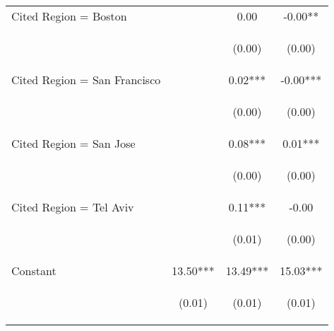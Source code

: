 \begin{center}
\begin{tabular}{lccc}
Cited Region = Boston &  & 0.00 & -0.00** \\
\vspace{4pt} & \begin{footnotesize}\end{footnotesize} & \begin{footnotesize}(0.00)\end{footnotesize} & \begin{footnotesize}(0.00)\end{footnotesize} \\
Cited Region = San Francisco &  & 0.02*** & -0.00*** \\
\vspace{4pt} & \begin{footnotesize}\end{footnotesize} & \begin{footnotesize}(0.00)\end{footnotesize} & \begin{footnotesize}(0.00)\end{footnotesize} \\
Cited Region = San Jose &  & 0.08*** & 0.01*** \\
\vspace{4pt} & \begin{footnotesize}\end{footnotesize} & \begin{footnotesize}(0.00)\end{footnotesize} & \begin{footnotesize}(0.00)\end{footnotesize} \\
Cited Region = Tel Aviv &  & 0.11*** & -0.00 \\
\vspace{4pt} & \begin{footnotesize}\end{footnotesize} & \begin{footnotesize}(0.01)\end{footnotesize} & \begin{footnotesize}(0.00)\end{footnotesize} \\
Constant & 13.50*** & 13.49*** & 15.03*** \\
 & \begin{footnotesize}(0.01)\end{footnotesize} & \begin{footnotesize}(0.01)\end{footnotesize} & \begin{footnotesize}(0.01)\end{footnotesize} \\

\end{tabular}
\end{center}
